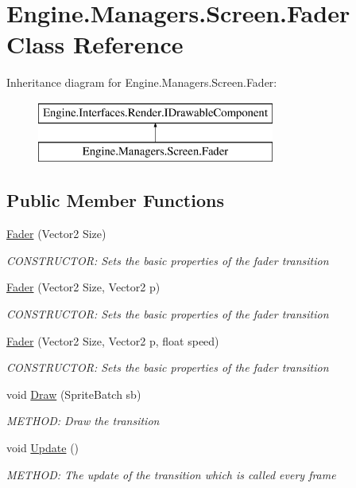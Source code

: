 \hypertarget{a00534}{}\section{Engine.\+Managers.\+Screen.\+Fader Class Reference}
\label{a00534}
Inheritance diagram for Engine.\+Managers.\+Screen.\+Fader\+:\begin{figure}[H]
\begin{center}
\leavevmode
\includegraphics[height=2.000000cm]{dc/d20/a00534}
\end{center}
\end{figure}
\subsection*{Public Member Functions}
\begin{DoxyCompactItemize}
\item 
\hyperlink{a00534_a6dd5b212e90e0c0db26e280c723dcd4f}{Fader} (Vector2 Size)
\begin{DoxyCompactList}\small\item\em C\+O\+N\+S\+T\+R\+U\+C\+T\+OR\+: Sets the basic properties of the fader transition \end{DoxyCompactList}\item 
\hyperlink{a00534_ac33d2bf58aea98d5739f2bb94540be63}{Fader} (Vector2 Size, Vector2 p)
\begin{DoxyCompactList}\small\item\em C\+O\+N\+S\+T\+R\+U\+C\+T\+OR\+: Sets the basic properties of the fader transition \end{DoxyCompactList}\item 
\hyperlink{a00534_ad75a8b6e54b0557b7b463051858524bc}{Fader} (Vector2 Size, Vector2 p, float speed)
\begin{DoxyCompactList}\small\item\em C\+O\+N\+S\+T\+R\+U\+C\+T\+OR\+: Sets the basic properties of the fader transition \end{DoxyCompactList}\item 
void \hyperlink{a00534_a8a40165cf8a910849e01fb35b9567ee2}{Draw} (Sprite\+Batch sb)
\begin{DoxyCompactList}\small\item\em M\+E\+T\+H\+OD\+: Draw the transition \end{DoxyCompactList}\item 
void \hyperlink{a00534_a25631a1ada84786c23242b896dc62692}{Update} ()
\begin{DoxyCompactList}\small\item\em M\+E\+T\+H\+OD\+: The update of the transition which is called every frame \end{DoxyCompactList}\end{DoxyCompactItemize}
